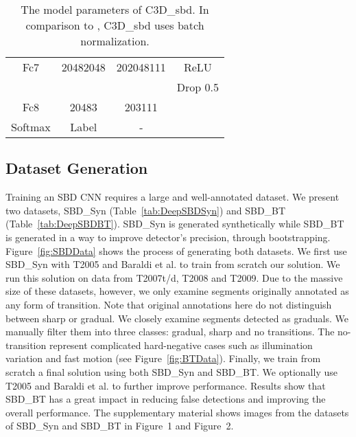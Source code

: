 \documentclass[journal]{IEEEtran}
\begin{document}
\begin{table}
\begin{tabular}{|c|c|c|c|}
Fc7     & 20482048                   & 202048111                   & ReLU          \\ 
        &                             &                                 & Drop 0.5                 \\ \hline

Fc8     & 20483                      & 203111                      &                     \\ \hline
Softmax & Label                       & -                               &                     \\ \hline
\end{tabular}\vspace{3pt}
\caption{The model parameters of C3D\_{sbd}. In comparison to \cite{Tran15}, C3D\_{sbd} uses batch normalization. 
}
\label{tab:DeepSBD_Arch}
\end{table}

\subsection{Dataset Generation}\label{Sec:Dataset}

Training an SBD CNN requires a large and well-annotated dataset. We present two datasets, SBD\_Syn (Table~\ref{tab:DeepSBDSyn}) and SBD\_BT (Table~\ref{tab:DeepSBDBT}). SBD\_Syn is generated synthetically while SBD\_BT is generated in a way to improve detector's precision, through bootstrapping. Figure~\ref{fig:SBDData} shows the process of generating both datasets. We first use SBD\_Syn with T2005 and Baraldi et al. to train from scratch our solution. We run this solution on data from T2007t/d, T2008 and T2009. Due to the massive size of these datasets, however, we only examine segments originally annotated as any form of transition. Note that original annotations here do not distinguish between sharp or gradual. We closely examine segments detected as graduals. We manually filter them into three classes: gradual, sharp and no transitions. The no-transition represent complicated hard-negative cases such as illumination variation and fast motion (see Figure~\ref{fig:BTData}). Finally, we train from scratch a final solution using both SBD\_Syn and SBD\_BT. We optionally use T2005 and Baraldi et al. to further improve performance. 
Results show that SBD\_BT has a great impact in reducing false detections and improving the overall performance. The supplementary material shows images from the datasets of SBD\_Syn and SBD\_BT in Figure~1 and Figure~2.   
\end{document}
